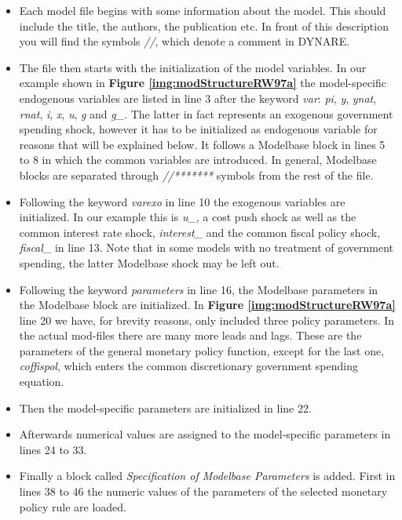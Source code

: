 \begin{itemize}
    \item Each model file begins with some information about the model. This should include the
    title, the authors, the publication etc. In front
    of this description you will find the symbols \textit{//}, which denote a comment in DYNARE.
    \item The file then starts with the initialization of the model variables. In our example shown in {\bf Figure
    \ref{img:modStructureRW97a}} the model-specific endogenous variables are listed in line 3 after the keyword \textit{var}:
    \textit{pi}, \textit{y}, \textit{ynat}, \textit{rnat}, \textit{i}, \textit{x}, \textit{u}, \textit{g}
    and \textit{g\_}. The latter in fact represents an exogenous government spending shock, however it has to be
    initialized as endogenous variable for reasons that will be explained below.
    It follows a Modelbase block in lines 5 to 8 in which the common variables are introduced.
    In general, Modelbase blocks are separated through \textit{//*******} symbols from the rest of the file.
    \item Following the keyword \textit{varexo} in line 10 the exogenous variables are initialized.
    In our example this is \textit{u\_}, a cost push shock as well as the common interest rate shock, \textit{interest\_} and
    the common fiscal policy shock, \textit{fiscal\_} in line 13. Note that in some models with no treatment of government spending, the
    latter Modelbase shock may be left out.
    \item Following the keyword \textit{parameters} in line 16, the Modelbase parameters in the Modelbase block are initialized.
    In {\bf Figure \ref{img:modStructureRW97a}} line 20 we have, for brevity reasons, only included three policy parameters.
    In the actual mod-files there are many more leads and lags. These are the parameters of the
    general monetary policy function, except for the last one, \textit{coffispol},
    which enters the common discretionary government spending equation.
    \item Then the model-specific parameters are initialized in line 22.
    \item Afterwards numerical values are assigned to the model-specific parameters in lines 24 to 33.
    \item Finally a block called \textit{Specification of Modelbase Parameters} is added. First in lines 38 to 46 the numeric
    values of the parameters of the selected monetary policy rule are loaded.

\end{itemize}

